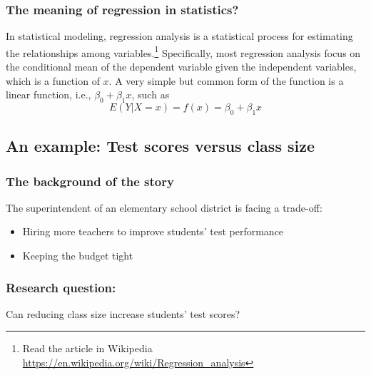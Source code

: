 \documentclass[a4paper,11pt]{article}
\begin{document}
\subsubsection*{The meaning of regression in statistics?}
\label{sec:org3c65071}
In statistical modeling, regression analysis is a statistical process
for estimating the relationships among variables.\footnote{Read
the article in Wikipedia
\url{https://en.wikipedia.org/wiki/Regression\_analysis}} Specifically, most
regression analysis focus on the conditional mean of the dependent
variable given the independent variables, which is a function of
\(x\). A very simple but common form of the function is a linear
function, i.e., \(\beta_0 + \beta_1 x\), such as
\begin{equation*}
E(Y | X = x) = f(x) = \beta_{0} + \beta_1 x
\end{equation*}

\subsection{An example: Test scores versus class size}
\label{sec:orgfa5ec3b}
\subsubsection*{The background of the story}
\label{sec:orgbc8de49}
The superintendent of an elementary school district is facing a
trade-off: 
\begin{itemize}
\item Hiring more teachers to improve students' test performance
\item Keeping the budget tight
\end{itemize}

\subsubsection*{Research question:}
\label{sec:org6b061ef}
Can reducing class size increase students' test scores?
\end{document}
